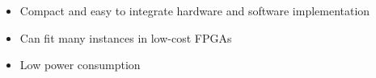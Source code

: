 \begin{itemize}
  \itemsep-0.5em
\item Compact and easy to integrate hardware and software implementation
\item Can fit many instances in low-cost FPGAs
\item Low power consumption
\end{itemize}
